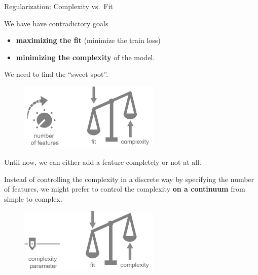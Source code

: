 \begin{vbframe}{Regularization: Complexity vs.~Fit}

We have have contradictory goals

\begin{itemize}

\item
  \textbf{maximizing the fit} (minimize the train loss)
\item
  \textbf{minimizing the complexity} of the model.
\end{itemize}

We need to find the \enquote{sweet spot}.

\begin{center}
\begin{figure}
\includegraphics[width=0.6\textwidth]{plots/complexity-vs-fit.png}
\end{figure}
\end{center}

\framebreak

Until now, we can either add a feature completely or not at all.

Instead of controlling the complexity in a discrete way by specifying
the number of features, we might prefer to control the complexity
\textbf{on a continuum} from simple to complex.

\vfill

\begin{center}
\begin{figure}
\includegraphics[width=0.6\textwidth]{plots/complexity-vs-fit-continuous.png}
\end{figure}
\end{center}

\end{vbframe}

